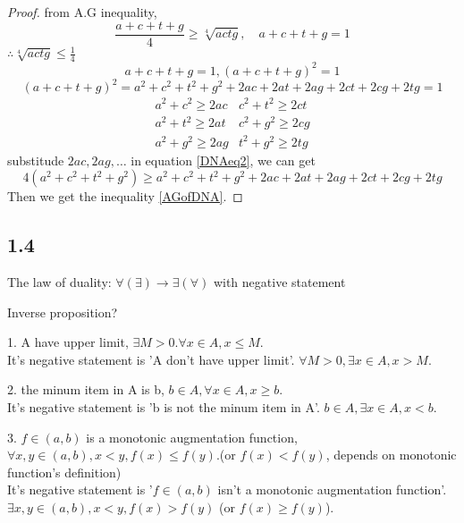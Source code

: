 \begin{proof}
 	from A.G inequality,
 	\begin{equation}\label{AGofDNA}
 		\frac{a+c+t+g}{4} \ge \sqrt[4]{actg}, \quad a+c+t+g=1
 	\end{equation}
 	$ \therefore \sqrt[4]{actg} \leqslant \frac{1}{4} $
 	\begin{equation*}
 		a+c+t+g=1, (a+c+t+g)^2=1
 	\end{equation*}
 	\begin{equation}\label{DNAeq2}
 		(a+c+t+g)^2=a^2+c^2+t^2+g^2+2ac+2at+2ag+2ct+2cg+2tg = 1
 	\end{equation}
 	\begin{align}
 		a^2+c^2 \ge 2ac &c^2+t^2 \ge 2ct \\
 		a^2+t^2 \ge 2at &c^2+g^2 \ge 2cg \\
 		a^2+g^2 \ge 2ag &t^2+g^2 \ge 2tg
 	\end{align}
 	substitude $ 2ac,2ag,\dots $ in equation \ref{DNAeq2}, we can get
 	\begin{equation*}
 		4(a^2+c^2+t^2+g^2)\ge a^2+c^2+t^2+g^2+2ac+2at+2ag+2ct+2cg+2tg
 	\end{equation*}
 	Then we get the inequality \ref{AGofDNA}.
\end{proof}
 	\subsection{1.4}
 	The law of duality: 
 	$ \forall(\exists) \rightarrow \exists(\forall) $
 	with negative statement
 	
 	Inverse proposition? 
 	
 	1. A have upper limit, $ \exists M>0. \forall x\in A, x\leqslant M $.\\
 	It's negative statement is 'A don't have upper limit'. $ \forall M >0, \exists x\in A, x>M $.
 	
 	2. the minum item in A is b, $ b\in A,\forall x\in A, x\ge b $.\\
 	It's negative statement is 'b is not the minum item in A'. $ b\in A, \exists x\in A, x< b $.
 	
 	3. $ f\in (a,b) $ is a monotonic augmentation function, $ \forall x,y \in (a,b), x<y, f(x)\leqslant f(y) $.(or $ f(x) < f(y) $, depends on monotonic function's definition)\\
 	It's negative statement is '$ f\in (a,b) $ isn't a monotonic augmentation function'. $ \exists x,y \in (a,b), x<y, f(x)>f(y) $ (or $ f(x)\ge f(y) $).
 	
